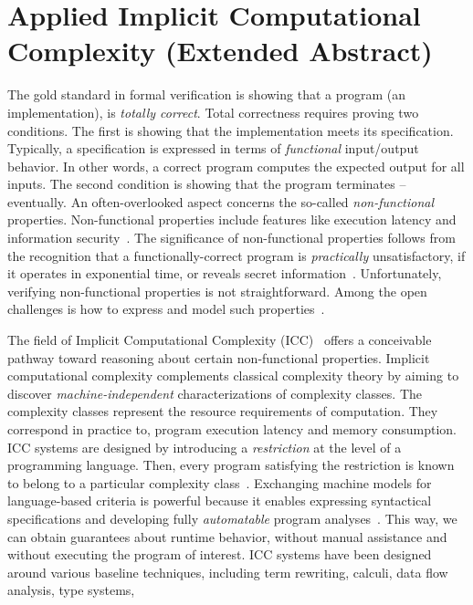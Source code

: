 \section{Applied Implicit Computational Complexity (Extended Abstract)}

The gold standard in formal verification is showing that a program (\ie an implementation), is \emph{totally correct}.
Total correctness requires proving two conditions.
The first is showing that the implementation meets its specification.
Typically, a specification is expressed in terms of \emph{functional} input/output behavior.
In other words, a correct program computes the expected output for all inputs.
The second condition is showing that the program terminates -- {eventually}.
An often-overlooked aspect concerns the so-called \emph{non-functional} properties.
Non-functional properties include features like execution latency and information security~\cite{terbeek2018}.
The significance of non-functional properties follows from the recognition that a functionally-correct program is \emph{practically} unsatisfactory,
if it operates in exponential time, or reveals secret information~\cite{heraud2011,aubert20222}.
Unfortunately, verifying non-functional properties is not straightforward.
Among the open challenges is how to express and model such properties~\cite{etaps2025}.

The field of {Implicit Computational Complexity (ICC)}~\cite{dallago2011} offers a conceivable pathway toward reasoning about certain non-functional properties.
Implicit computational complexity complements classical complexity theory by aiming to discover \emph{machine-independent} characterizations of complexity classes.
The complexity classes represent the resource requirements of computation.
They correspond in practice to, \eg program execution latency and memory consumption.
ICC systems are designed by introducing a \emph{restriction} at the level of a programming language.
Then, every program satisfying the restriction is known to belong to a particular complexity class~\cite{pchoux2020}.
Exchanging machine models for language-based criteria is powerful because it enables expressing syntactical specifications and developing fully \emph{automatable} program analyses~\cite{heraud2011}.
This way, we can obtain {guarantees} about runtime behavior, without manual assistance and without executing the program of interest.
ICC systems have been designed around various baseline techniques, including term rewriting, calculi, data flow analysis, type systems, \etc~\cite{baillot2012,moyen2017}

